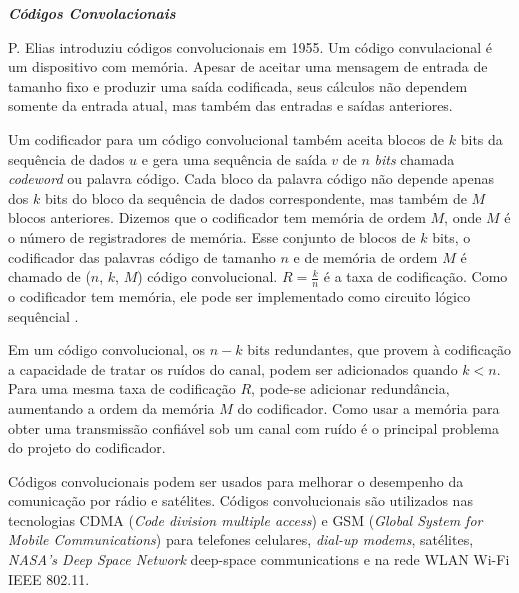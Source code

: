 \vspace{1cm}

{\bf \emph{Códigos Convolacionais}}

\vspace{0.5cm}

P. Elias introduziu códigos convolucionais em 1955. Um código convulacional é um dispositivo com memória. Apesar de aceitar uma mensagem de entrada de tamanho fixo e produzir uma saída codificada, seus cálculos não dependem somente da entrada atual, mas também das entradas e saídas anteriores.

Um codificador para um código convolucional também aceita blocos de $k$ bits da sequência de dados $u$ e gera uma sequência de saída $v$ de $n$ \emph{bits} chamada \emph{codeword} ou palavra código. Cada bloco da palavra código não depende apenas dos $k$ bits do bloco da sequência de dados correspondente, mas também de $M$ blocos anteriores. Dizemos que o codificador tem memória de ordem $M$, onde $M$ é o número de registradores de memória. Esse conjunto de blocos de $k$ bits, o codificador das palavras código de tamanho $n$ e de memória de ordem $M$ é chamado de ($n$, $k$, $M$) código convolucional. $R = \frac{k}{n}$  é a taxa de codificação. Como o codificador tem memória, ele pode ser implementado como circuito lógico sequêncial \cite{Lin:1983}.

Em um código convolucional, os $n - k$ bits redundantes, que provem à codificação a capacidade de tratar os ruídos do canal, podem ser adicionados quando $k < n$. Para uma mesma taxa de codificação $R$, pode-se adicionar redundância, aumentando a ordem da memória $M$ do codificador. Como usar a memória para obter uma transmissão confiável sob um canal com ruído é o principal problema do projeto do codificador.

Códigos convolucionais podem ser usados para melhorar o desempenho da comunicação por rádio e satélites. Códigos convolucionais são utilizados nas tecnologias CDMA (\emph{Code division multiple access}) e GSM (\emph{Global System for Mobile Communications}) para telefones celulares, \emph{dial-up modems}, satélites, \emph{NASA's Deep Space Network} deep-space communications e na rede WLAN Wi-Fi IEEE 802.11.

\vspace{1cm}
